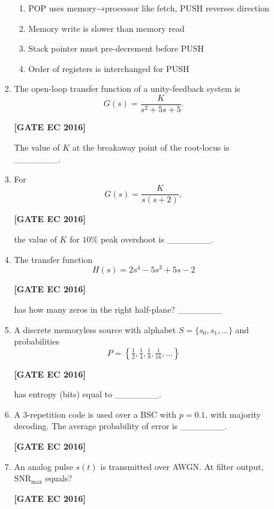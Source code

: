 \documentclass[12pt]{article}
\begin{document}
\begin{enumerate}[label=\textbf{Q.\arabic*.}, start=6, itemsep=2em]
\begin{enumerate}[label=\textbf{Q.\arabic*.}, start=26]
\begin{enumerate}[label=\textbf{Q.\arabic*.}, start=31]
\begin{multicols}{2}
    \begin{enumerate}
        \item POP uses memory→processor like fetch, PUSH reverses direction
        \item Memory write is slower than memory read
        \item Stack pointer must pre-decrement before PUSH
        \item Order of registers is interchanged for PUSH
    \end{enumerate}
\end{multicols}

\item The open-loop transfer function of a unity-feedback system is
\[
G(s) = \frac{K}{s^2 + 5s + 5}.
\]

\noindent \textbf{[GATE EC 2016]}

The value of $K$ at the breakaway point of the root-locus is \_\_\_\_\_\_\_.

\item For
\[
G(s) = \frac{K}{s(s+2)},
\]

\noindent \textbf{[GATE EC 2016]}

the value of $K$ for $10\%$ peak overshoot is \_\_\_\_\_\_\_.

\item The transfer function
\[
H(s) = 2s^{4} - 5s^{3} + 5s - 2
\]

\noindent \textbf{[GATE EC 2016]}

has how many zeros in the right half-plane? \_\_\_\_\_\_\_

\item A discrete memoryless source with alphabet $S = \{s_0, s_1, \dots\}$ and probabilities
\[
P = \left\{\tfrac{1}{2}, \tfrac{1}{4}, \tfrac{1}{8}, \tfrac{1}{16}, \dots \right\}
\]

\noindent \textbf{[GATE EC 2016]}

has entropy (bits) equal to \_\_\_\_\_\_\_.

\item A 3-repetition code is used over a BSC with $p=0.1$, with majority decoding. The average probability of error is \_\_\_\_\_\_\_.

\noindent \textbf{[GATE EC 2016]}

\item An analog pulse $s(t)$ is transmitted over AWGN. At filter output, $\mathrm{SNR}_{\max}$ equals?

\noindent \textbf{[GATE EC 2016]}


\end{enumerate}
\end{enumerate}
\end{enumerate}
\end{document}
